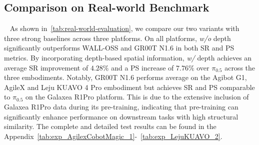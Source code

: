 
\subsection{Comparison on Real-world Benchmark}~\label{sec:real}
As shown in~\cref{tab:real-world-evaluation}, we compare our two \method variants with three strong baselines across three platforms. On all platforms, \method \textit{w/o} depth significantly outperforms WALL-OSS and GR00T N1.6 in both SR and PS metrics. By incorporating depth-based spatial information, \method\textit{w/} depth achieves an average SR improvement of $4.28\%$ and a PS increase of $7.76\%$ over $\pi_{0.5}$ across the three embodiments.
Notably, GR00T N1.6 performs average on the Agibot G1, AgileX and Leju KUAVO 4 Pro embodiment but achieves SR and PS comparable to $\pi_{0.5}$ on the Galaxea R1Pro platform. This is due to the extensive inclusion of Galaxea R1Pro data during its pre-training, indicating that pre-training can significantly enhance performance on downstream tasks with high structural similarity.
The complete and detailed test results can be found in the Appendix~\cref{tab:exp_AgilexCobotMagic_1}-~\ref{tab:exp_LejuKUAVO_2}.


